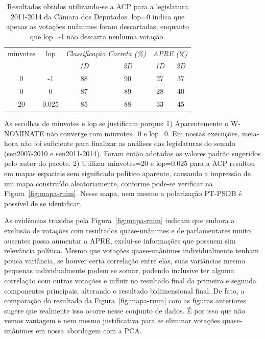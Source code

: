 \documentclass[
	article,			%
	12pt,				%
	oneside,			%
	a4paper,			%
	english,			%
	brazil,				%
	sumario=tradicional,
	oldfontcommands %
	]{abntex2}
\newcommand\wnominate{W-NOMINATE\xspace}
\begin{document}
\begin{table}
\centering
\begin{tabular}{c c c c c c}
\textsf{minvotes} & \textsf{lop} & \multicolumn{2}{c}{\itshape Classificação Correta (\%)} & \multicolumn{2}{c}{\itshape APRE (\%)} \\
 & & \itshape 1D & \itshape 2D & \itshape 1D & \itshape 2D \\
\hline
0 & -1     & 88 & 90 & 27 & 37 \\
0 &  0     & 87 & 89 & 28 & 40\\
20 & 0.025 & 85 & 88 & 33 & 45\\
\end{tabular} 
\caption{Resultados obtidos utilizando-se a ACP para a legislatura 2011-2014 da Câmara dos Deputados. \textsf{lop=0} indica que apenas as votações unânimes foram descartadas, enquanto que \textsf{lop=-1} não descarta nenhuma votação.}
\label{tab:variando-lop}
\end{table}

As escolhas de \textsf{minvotes} e \textsf{lop} se justificam porque: 1) Aparentemente o \wnominate não converge com \textsf{minvotes=0} e \textsf{lop=0}. Em nossas execuções, meia-hora não foi suficiente para finalizar as análises das legislaturas do senado (sen2007-2010 e sen2011-2014). Foram então adotados os valores padrão sugeridos pelo autor do pacote. 2) Utilizar \textsf{minvotes=20} e \textsf{lop=0.025} para a ACP resultou em mapas espaciais sem significado político aparente, causando a impressão de um mapa construído aleatoriamente, conforme pode-se verificar na Figura~\ref{fig:mapa-ruim}. Nesse mapa, nem mesmo a polarização PT-PSDB é possível de se identificar. 

As evidências trazidas pela Figura~\ref{fig:mapa-ruim} indicam que embora a exclusão de votações com resultados quase-unânimes e de parlamentares muito ausentes possa aumentar a APRE, exclui-se informações que possuem sim relevância política. Mesmo que votações quase-unânimes individualmente tenham pouca variância, se houver certa correlação entre elas, suas variâncias mesmo pequenas individualmente podem se somar, podendo inclusive ter alguma correlação com outras votações e influir no resultado final da primeira e segunda componentes principais, alterando o resultado bidimensional final. De fato, a comparação do resultado da Figura~\ref{fig:mapa-ruim} com as figuras anteriores sugere que realmente isso ocorre nesse conjunto de dados. É por isso que não vemos vantagem e nem mesmo justificativa para se eliminar votações quase-unânimes em nossa abordagem com a PCA.
\end{document}
